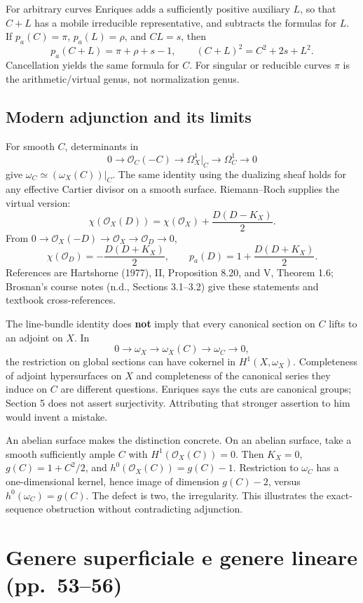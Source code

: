 For arbitrary curves Enriques adds a sufficiently positive auxiliary \(L\), so that \(C+L\) has a mobile irreducible representative, and subtracts the formulas for \(L\). If \(p_a(C)=\pi\), \(p_a(L)=\rho\), and \(CL=s\), then \[
p_a(C+L)=\pi+\rho+s-1,\qquad(C+L)^2=C^2+2s+L^2.
\] Cancellation yields the same formula for \(C\). For singular or reducible curves \(\pi\) is the arithmetic/virtual genus, not normalization genus.

\subsection{Modern adjunction and its limits}

For smooth \(C\), determinants in \[
0\to\mathcal O_C(-C)\to\Omega_X^1|_C\to\Omega_C^1\to0
\] give \(\omega_C\simeq(\omega_X(C))|_C\). The same identity using the dualizing sheaf holds for any effective Cartier divisor on a smooth surface. Riemann--Roch supplies the virtual version: \[
\chi(\mathcal O_X(D))=\chi(\mathcal O_X)+\frac{D(D-K_X)}2.
\] From \(0\to\mathcal O_X(-D)\to\mathcal O_X\to\mathcal O_D\to0\), \[
\chi(\mathcal O_D)=-\frac{D(D+K_X)}2,\qquad
p_a(D)=1+\frac{D(D+K_X)}2.
\] References are Hartshorne (1977), II, Proposition 8.20, and V, Theorem 1.6; Brosnan's course notes (n.d., Sections 3.1--3.2) give these statements and textbook cross-references.

The line-bundle identity does \textbf{not} imply that every canonical section on \(C\) lifts to an adjoint on \(X\). In \[
0\to\omega_X\to\omega_X(C)\to\omega_C\to0,
\] the restriction on global sections can have cokernel in \(H^1(X,\omega_X)\). Completeness of adjoint hypersurfaces on \(X\) and completeness of the canonical series they induce on \(C\) are different questions. Enriques says the cuts are canonical groups; Section 5 does not assert surjectivity. Attributing that stronger assertion to him would invent a mistake.

An abelian surface makes the distinction concrete. On an abelian surface, take a smooth sufficiently ample \(C\) with \(H^1(\mathcal O_X(C))=0\). Then \(K_X=0\), \(g(C)=1+C^2/2\), and \(h^0(\mathcal O_X(C))=g(C)-1\). Restriction to \(\omega_C\) has a one-dimensional kernel, hence image of dimension \(g(C)-2\), versus \(h^0(\omega_C)=g(C)\). The defect is two, the irregularity. This illustrates the exact-sequence obstruction without contradicting adjunction.

\section[Genere superficiale e lineare]{Genere superficiale e genere lineare (pp.~53--56)}\label{commentary-II-6}

